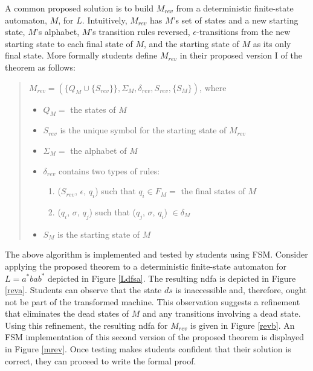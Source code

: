\documentclass{eptcs}
\begin{document}
A common proposed solution is to build $M_{rev}$ from a deterministic finite-state automaton, $M$, for $L$. Intuitively, $M_{rev}$ has $M$'s set of states and a new starting state, $M$'s alphabet, $M$'s transition rules reversed,  $\epsilon$-transitions from the new starting state to each final state of $M$, and the starting state of $M$ as its only final state. More formally students define $M_{rev}$ in their proposed version I of the theorem as follows:
\begin{quote}
$M_{rev} = (\{Q_M \cup \{S_{rev}\}\}, \Sigma_M, \delta_{rev}, S_{rev}, \{S_M\})$, where
\begin{itemize}
  \item $Q_M = $ the states of $M$
  \item $S_{rev}$ is the unique symbol for the starting state of $M_{rev}$
  \item $\Sigma_M =$ the alphabet of $M$
  \item $\delta_{rev}$ contains two types of rules:
  \begin{enumerate}
     \item ($S_{rev}$, $\epsilon$, $q_i$) such that $q_i \in F_M =$ the final states of $M$
     \item ($q_i$, $\sigma$, $q_j$) such that ($q_j$, $\sigma$, $q_i$) $\in \delta_M$
  \end{enumerate}
  \item $S_M$ is the starting state of $M$
\end{itemize}
\end{quote}

The above algorithm is implemented and tested by students using \textsf{FSM}. Consider applying the proposed theorem to a deterministic finite-state automaton for $L = a^*bab^*$ depicted in Figure \ref{Ldfsa}. The resulting \textsf{ndfa} is depicted in Figure \ref{reva}. Students can observe that the state $ds$ is inaccessible and, therefore, ought not be part of the transformed machine. This observation suggests a refinement that eliminates the dead states of $M$ and any transitions involving a dead state. Using this refinement, the resulting \textsf{ndfa} for $M_{rev}$ is given in Figure \ref{revb}. An \textsf{FSM} implementation of this second version of the proposed theorem is displayed in Figure \ref{mrev}. Once testing makes students confident that their solution is correct, they can proceed to write the formal proof.
\end{document}
